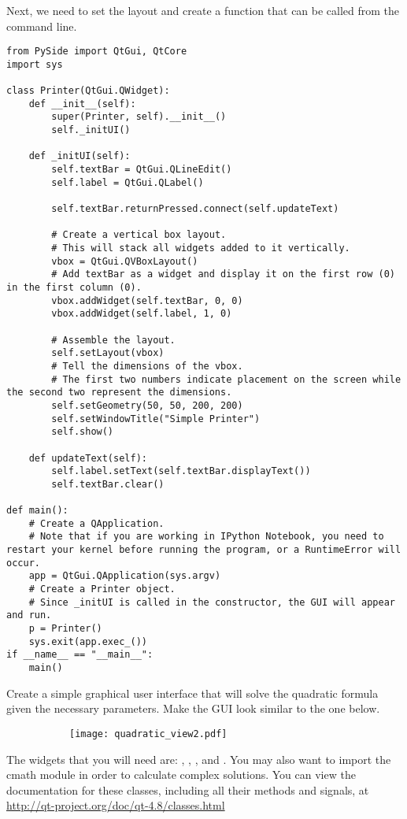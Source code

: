 Next, we need to set the layout and create a function that can be called from the command line.

\begin{lstlisting}
from PySide import QtGui, QtCore
import sys

class Printer(QtGui.QWidget):
	def __init__(self):
		super(Printer, self).__init__()
		self._initUI()

	def _initUI(self):
		self.textBar = QtGui.QLineEdit()
		self.label = QtGui.QLabel()

		self.textBar.returnPressed.connect(self.updateText)

		# Create a vertical box layout.
		# This will stack all widgets added to it vertically.
		vbox = QtGui.QVBoxLayout()
		# Add textBar as a widget and display it on the first row (0) in the first column (0).
        vbox.addWidget(self.textBar, 0, 0)
		vbox.addWidget(self.label, 1, 0)

		# Assemble the layout.
		self.setLayout(vbox)
		# Tell the dimensions of the vbox.
		# The first two numbers indicate placement on the screen while the second two represent the dimensions.
		self.setGeometry(50, 50, 200, 200)
		self.setWindowTitle("Simple Printer")
		self.show()

	def updateText(self):
		self.label.setText(self.textBar.displayText())
		self.textBar.clear()

def main():
	# Create a QApplication.
    # Note that if you are working in IPython Notebook, you need to restart your kernel before running the program, or a RuntimeError will occur.
	app = QtGui.QApplication(sys.argv)
	# Create a Printer object.
    # Since _initUI is called in the constructor, the GUI will appear and run.
	p = Printer()
	sys.exit(app.exec_())
if __name__ == "__main__":
	main()

\end{lstlisting}

\begin{problem}
Create a simple graphical user interface that will solve the quadratic formula given the necessary parameters.
Make the GUI look similar to the one below.
\begin{figure}[H]
\centering
\begin{comment}
\begin{subfigure}[b]{.49\textwidth}
\texttt{[image: quadratic\_view.pdf]}
\end{subfigure}
\end{comment}
\begin{subfigure}[b]{.49\textwidth}
\texttt{[image: quadratic\_view2.pdf]}
\end{subfigure}
\end{figure}
The widgets that you will need are: , , , and . You may also want to import the cmath module in order to calculate complex solutions.
You can view the documentation for these classes, including all their methods and signals, at \url{http://qt-project.org/doc/qt-4.8/classes.html}
\label{prob:quadCalc}
\end{problem}


